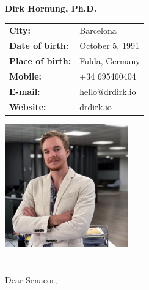 \documentclass[11pt]{article}
\begin{document}
\Large
\noindent
\textbf{Dirk Hornung, Ph.D.} \\

\normalsize
\noindent
\begin{minipage}{0.5\linewidth}
  \begin{tabularx}{0.6\textwidth}{>{\bfseries}l l}
    City:           & Barcelona \\
    Date of birth:  & October 5, 1991\\
    Place of birth: & Fulda, Germany \\
    Mobile:         & +34 695460404 \\
    E-mail:         & hello@drdirk.io \\
    Website:      	& drdirk.io
  \end{tabularx}
\end{minipage}
\begin{minipage}{0.5\linewidth}
  \begin{flushright}
    \includegraphics[width=0.4\textwidth]{dirk.png}
  \end{flushright}
\end{minipage}
	


 \section*{}
 \vspace{1cm}
 Dear Senacor, \\
\end{document}
